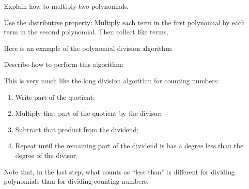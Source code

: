 \documentclass[nooutcomes]{ximera}
\begin{document}
\begin{problem}Explain how to multiply two polynomials.
\begin{freeResponse}
\begin{hint}
Use the distributive property:  Multiply each term in the first polynomial by each term in the second polynomial.  Then collect like terms.  
\end{hint}
\end{freeResponse}
\end{problem} 

\begin{problem}Here is an example of the polynomial division algorithm:
\begin{image}  
\end{image}

Describe how to perform this algorithm:  
\begin{freeResponse}
\begin{hint}
This is very much like the long division algorithm for counting numbers: 
\begin{enumerate} 
\item Write part of the quotient;
\item Multiply that part of the quotient by the divisor;
\item Subtract that product from the dividend; 
\item Repeat until the remaining part of the dividend is has a degree less than the degree of the divisor. 
\end{enumerate}
Note that, in the last step, what counts as ``less than'' is different for dividing polynomials than for dividing counting numbers.
\end{hint}
\end{freeResponse}

\end{problem} 
\end{document}
